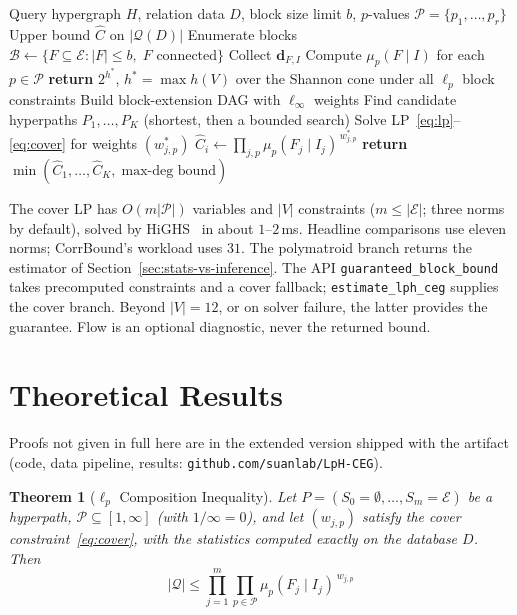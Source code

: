\documentclass[conference]{IEEEtran}
\newcommand{\query}{\mathcal{Q}}
\newcommand{\block}{F}
\newcommand{\interface}{I}
\newcommand{\joinstate}{S}
\newcommand{\muLp}[3]{\mu_{#1}(#2 \mid #3)}
\newtheorem{theorem}{Theorem}
\begin{document}
\begin{algorithm}[t]
\caption{LpH-CEG Estimation}
\label{alg:lph-ceg}
\begin{algorithmic}[1]
\REQUIRE Query hypergraph $H$, relation data $D$, block size limit $b$,
  $p$-values $\mathcal{P} = \{p_1, \ldots, p_r\}$
\ENSURE Upper bound $\hat{C}$ on $|\query(D)|$
\STATE Enumerate blocks $\mathcal{B} \gets \{F \subseteq \mathcal{E} :
  |F| \le b,\; F \text{ connected}\}$
  \STATE Collect $\mathbf{d}_{F,I}$ 
  \STATE Compute $\muLp{p}{F}{I}$ for each $p \in \mathcal{P}$
\ENDFOR
{}
  \STATE \textbf{return} $2^{h^*}$, $h^* = \max h(V)$ over the Shannon cone under all $\ell_p$ block constraints
\ENDIF
\STATE Build block-extension DAG with $\ell_\infty$ weights
\STATE Find candidate hyperpaths $P_1, \ldots, P_K$ (shortest, then a bounded search) 
  \STATE Solve LP~\eqref{eq:lp}--\eqref{eq:cover} for weights $(w^*_{j,p})$
  \STATE $\hat{C}_i \gets \prod_{j,p} \muLp{p}{F_j}{I_j}^{\,w^*_{j,p}}$
\ENDFOR
\STATE \textbf{return} $\min(\hat{C}_1, \ldots, \hat{C}_K,\; \text{max-deg bound})$
\end{algorithmic}
\end{algorithm}

The cover LP has $O(m|\mathcal{P}|)$ variables and $|V|$ constraints ($m\le|\mathcal{E}|$; three norms by default), solved by HiGHS~\cite{huangfu2018highs} in about $1$--$2$\,ms. Headline comparisons use eleven norms; CorrBound's workload uses $31$. The polymatroid branch returns the estimator of Section~\ref{sec:stats-vs-inference}. The API \texttt{guaranteed\_block\_bound} takes precomputed constraints and a cover fallback; \texttt{estimate\_lph\_ceg} supplies the cover branch. Beyond $|V|{=}12$, or on solver failure, the latter provides the guarantee. Flow is an optional diagnostic, never the returned bound.

\section{Theoretical Results}
\label{sec:theory}
Proofs not given in full here are in the extended version shipped with
the artifact (code, data pipeline, results:
\texttt{github.com/suanlab/LpH-CEG}).

\begin{theorem}[$\ell_p$ Composition Inequality]
\label{thm:composition}
Let $P = (\joinstate_0{=}\emptyset, \ldots, \joinstate_m{=}\mathcal{E})$
be a hyperpath, $\mathcal{P}\subseteq[1,\infty]$ (with $1/\infty{=}0$), and
let $(w_{j,p})$ satisfy the cover constraint~\eqref{eq:cover}, with the
statistics computed exactly on the database $D$. Then
\[
|\query| \le \prod_{j=1}^{m} \prod_{p \in \mathcal{P}}
\muLp{p}{\block_j}{\interface_j}^{\,w_{j,p}}
\]
\end{theorem}
\end{document}

